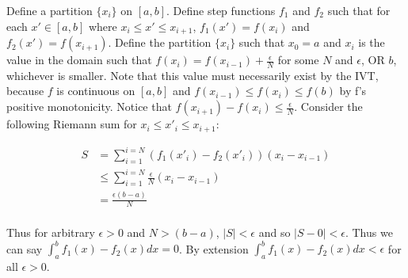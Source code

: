 \documentclass[10pt]{article} %
\begin{document}
Define a partition $\{x_i\}$ on $[a,b]$. Define step functions $f_1$ and $f_2$ such that for each $x' \in [a,b]$ where $x_i \leq x' \leq x_{i+1}$, $f_1(x') = f(x_i)$ and $f_2(x') = f(x_{i+1})$. Define the partition $\{x_i\}$ such that $x_0 = a$ and $x_i$ is the value in the domain such that $f(x_i) = f(x_{i-1})+\frac{\epsilon}{N}$ for some $N$ and $\epsilon$, OR $b$, whichever is smaller. Note that this value must necessarily exist by the IVT, because $f$ is continuous on $[a,b]$ and $f(x_{i-1}) \leq f(x_i) \leq f(b)$ by f's positive monotonicity. Notice that $f(x_{i+1}) - f(x_i) \leq \frac{\epsilon}{N}$. Consider the following Riemann sum for $x_i \leq x'_i \leq x_{i+1}$:

\begin{align*}
  S &= \sum_{i=1}^{i=N} \left(f_1(x'_i) - f_2(x'_i)\right)\left(x_i-x_{i-1}\right)\\
  &\leq \sum_{i=1}^{i=N} \frac{\epsilon}{N}\left(x_i-x_{i-1}\right)\\
  &= \frac{\epsilon(b-a)}{N}\\
\end{align*}

Thus for arbitrary $\epsilon>0$ and $N > (b-a)$, $|S| < \epsilon$ and so $|S-0|<\epsilon$. Thus we can say $\int_a^bf_1(x)-f_2(x)dx = 0$. By extension $\int_a^bf_1(x)-f_2(x)dx < \epsilon$ for all $\epsilon>0$.
\end{document}
